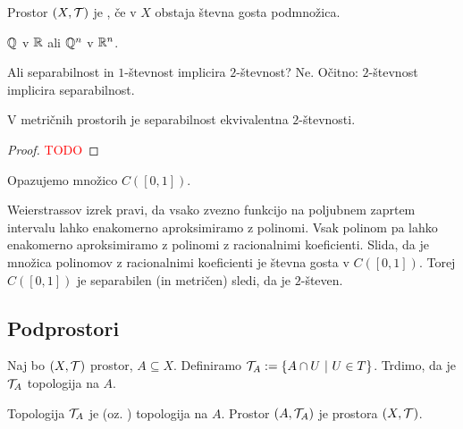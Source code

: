 \newpage
\begin{definicija}
    Prostor $(X, \mathcal{T})$ je , če v $X$ obstaja števna gosta podmnožica.
\end{definicija}

\begin{primer}
    $\mathbb{Q}$ v $\mathbb{R}$ ali $\mathbb{Q}^n$ v $\mathbb{R}^n$.
\end{primer}

Ali separabilnost in $1$-števnost implicira $2$-števnost? Ne.
Očitno: $2$-števnost implicira separabilnost.

\begin{trditev}
    V metričnih prostorih je separabilnost ekvivalentna $2$-števnosti.
\end{trditev}

\begin{proof}
    \textcolor{red}{TODO}
\end{proof}

\begin{primer}
    Opazujemo množico $C([0,1])$. 
    
    Weierstrassov izrek pravi, da vsako zvezno funkcijo na poljubnem zaprtem intervalu lahko enakomerno aproksimiramo z polinomi.
    Vsak polinom pa lahko enakomerno aproksimiramo z polinomi z racionalnimi koeficienti. Slida, da je množica polinomov z racionalnimi koeficienti je števna gosta v $C([0,1])$. Torej $C([0,1])$ je separabilen (in metričen) sledi, da je $2$-števen.
\end{primer}

\subsection{Podprostori}
Naj bo $(X, \mathcal{T})$ prostor, $A \subseteq X$. Definiramo $\mathcal{T}_A := \left\{A \cap U \ | \ U \in T\right\}$. Trdimo, da je $\mathcal{T}_A$ topologija na $A$.

\begin{definicija}
    Topologija $\mathcal{T}_A$ je  (oz. ) topologija na $A$.
    Prostor $(A, \mathcal{T}_A)$ je  prostora $(X, \mathcal{T})$.
\end{definicija}

